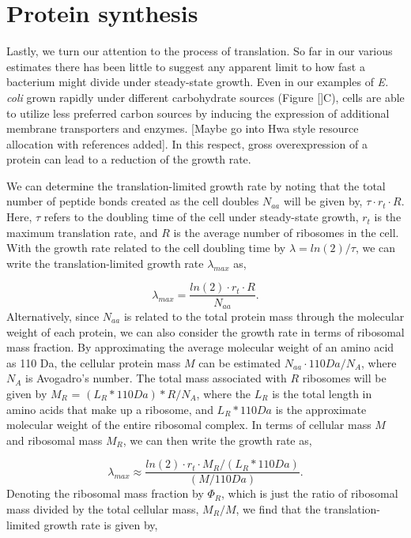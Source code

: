\section{Protein synthesis}

Lastly, we turn our attention to the process of translation. So far in our
various estimates there has been little to suggest any apparent limit to how
fast a bacterium might divide under steady-state growth. Even in our examples of
\textit{E. coli} grown rapidly under different carbohydrate sources (Figure
[]C),  cells are able to utilize less preferred carbon sources by inducing the
expression of additional membrane transporters and enzymes. [Maybe go into Hwa
style resource allocation with references added]. In this respect, gross
overexpression of a protein can lead to a reduction of the growth rate.

We can determine the translation-limited growth rate by noting that the total
number of peptide bonds created as the cell doubles $N_{aa}$ will be given by,
$\tau \cdot r_t \cdot R$. Here, $\tau$ refers to the doubling time of the cell
under steady-state growth, $r_t$ is the maximum translation rate, and $R$ is the
average number of ribosomes in the cell. With the growth rate related to the
cell doubling time by $\lambda = ln(2)/\tau$, we can write the
translation-limited growth rate $\lambda_{max}$ as,

\begin{equation}
\lambda_{max} = \frac{ln(2) \cdot r_t \cdot R}{N_{aa}}.
\end{equation}
Alternatively, since $N_{aa}$ is related to the total protein mass through the
molecular weight of each protein, we can also consider the growth rate in terms
of ribosomal mass fraction. By approximating the average molecular weight of an
amino acid as 110 Da, the cellular protein mass $M$ can be estimated $N_{aa}
\cdot 110 Da / N_A$, where $N_A$ is Avogadro's number. The total mass associated
with $R$ ribosomes will be given by $M_R$ = $(L_R * 110 Da) * R / N_A$,  where
the $L_R$ is the total length in amino acids that make up a ribosome,  and $L_R
* 110 Da$ is the approximate molecular weight of the entire ribosomal complex. In terms of
cellular mass $M$ and ribosomal mass $M_R$, we can then write the growth rate as,

\begin{equation}
\lambda_{max} \approx \frac{ln(2) \cdot r_t \cdot M_R/(L_R * 110 Da) }{(M/110 Da)}.
\end{equation}
Denoting the ribosomal mass fraction
by $\Phi_R$, which is just the ratio of ribosomal mass divided by the total cellular mass,
$M_R/M$, we find that the translation-limited growth rate is given by,

